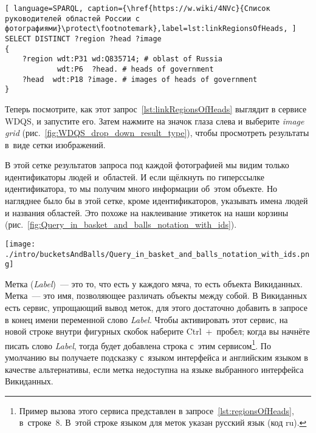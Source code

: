 \begin{lstlisting}[ language=SPARQL, caption={\href{https://w.wiki/4NVc}{Список руководителей областей России с фотографиями}\protect\footnotemark},label=lst:linkRegionsOfHeads, ]
SELECT DISTINCT ?region ?head ?image
{
    ?region wdt:P31 wd:Q835714; # oblast of Russia
            wdt:P6  ?head. # heads of government
    ?head  wdt:P18 ?image. # images of heads of government
}
\end{lstlisting}




\newpage 
Теперь посмотрите, как этот запрос~\ref{lst:linkRegionsOfHeads} выглядит в сервисе WDQS, и запустите его. 
Затем нажмите на значок глаза слева и выберите \textit{image grid} 
(рис.~\ref{fig:WDQS_drop_down_result_type}), чтобы просмотреть результаты в~виде сетки изображений.

\begin{marginfigure}
	{
		\setlength{\fboxsep}{0pt}%
		\setlength{\fboxrule}{1pt}%
	}
    \caption[Выбор отображения результатов запроса в виде сетки изображений.]{Выбор отображения результатов запроса в виде \textit{image grid} (сетки изображений)}
	\label{fig:WDQS_drop_down_result_type}
\end{marginfigure}

В этой сетке результатов запроса 
под каждой фотографией мы видим только идентификаторы людей и~областей. 
И если щёлкнуть по гиперссылке идентификатора, то мы получим много информации об~этом объекте. 
Но нагляднее было бы в этой сетке, кроме идентификаторов, указывать имена людей и названия областей. 
Это похоже на наклеивание этикеток на наши корзины (рис.~\ref{fig:Query_in_basket_and_balls_notation_with_ids}).

\begin{marginfigure}
\texttt{[image: ./intro/bucketsAndBalls/Query\_in\_basket\_and\_balls\_notation\_with\_ids.png]}
\caption{Запрос в нотации <<Корзины и мячи>> с~номерами свойств и~объектов Викиданных}
\label{fig:Query_in_basket_and_balls_notation_with_ids}
\end{marginfigure}

Метка (\textit{Label})~--- это то, что есть у каждого мяча, то есть объекта Викиданных. 
Метка~--- это имя, позволяющее различать объекты между собой. 
В Викиданных есть сервис, упрощающий вывод меток, 
для этого достаточно добавить в запросе в конец имени переменной слово \textit{Label}.
Чтобы активировать этот сервис, на новой строке внутри фигурных скобок наберите Ctrl~+~пробел; 
когда вы начнёте писать слово \textit{Label}, тогда будет добавлена строка с~этим сервисом\footnote[][12pt]{%
%
Пример вызова этого сервиса представлен в запросе~\ref{lst:regionsOfHeads}, в~строке~8. 
В~этой строке языком для меток указан русский язык (код ru).}. По умолчанию 
вы получаете подсказку с~языком интерфейса 
и английским языком в качестве альтернативы, если метка недоступна на языке выбранного интерфейса Викиданных.


